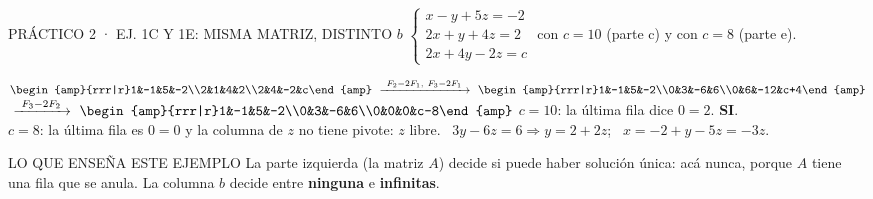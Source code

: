 \begin{enunciado}{PRÁCTICO 2 · EJ. 1C Y 1E: MISMA MATRIZ, DISTINTO $b$}
$\left\{\begin{array}{l}x-y+5z=-2\\2x+y+4z=2\\2x+4y-2z=c\end{array}\right.$ \quad con $c=10$ (parte c) y con $c=8$ (parte e).
\end{enunciado}
$\begin{amp}{rrr|r}1&-1&5&-2\\2&1&4&2\\2&4&-2&c\end{amp}
\op{F_2-2F_1,\ F_3-2F_1}
\begin{amp}{rrr|r}1&-1&5&-2\\0&3&-6&6\\0&6&-12&c+4\end{amp}$\\[4pt]
\hspace*{25mm}$\op{F_3-2F_2}
\begin{amp}{rrr|r}1&-1&5&-2\\0&3&-6&6\\0&0&0&c-8\end{amp}$
$c=10$: la última fila dice $0=2$. \textbf{SI}.\\
$c=8$: la última fila es $0=0$ y la columna de $z$ no tiene pivote: $z$ libre. \ $3y-6z=6\Rightarrow y=2+2z$; \ $x=-2+y-5z=-3z$.
\begin{tip}{LO QUE ENSEÑA ESTE EJEMPLO}
La parte izquierda (la matriz $A$) decide si puede haber solución única: acá nunca, porque $A$ tiene una fila que se anula. La columna $b$ decide entre \textbf{ninguna} e \textbf{infinitas}.
\end{tip}

